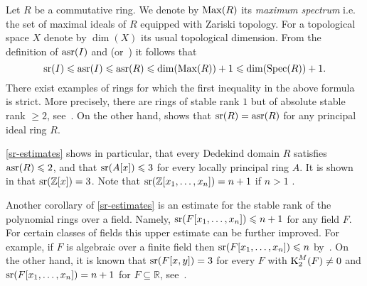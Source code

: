 Let $R$ be a commutative ring. We denote by $\operatorname{Max}(R)$ its \emph{maximum spectrum} i.e. the set of maximal ideals of $R$ equipped with Zariski topology. For a topological space $X$ denote by $\dim(X)$ its usual topological dimension.
From the definition of $\operatorname{asr}(I)$ and \cite[Theorem~2.3]{EO} (or~\cite[Theorem~3.7]{MKV}) it follows that
\begin{equation} \label{sr-estimates} \operatorname{sr}(I)\leqslant\operatorname{asr}(I)\leqslant\operatorname{asr}(R)\leqslant \dim(\operatorname{Max}(R))+1\leqslant\dim(\operatorname{Spec}(R))+1. \end{equation}
There exist examples of rings for which the first inequality in the above formula is strict.
More precisely, there are rings of stable rank $1$ but of absolute stable rank $\geqslant2$, see~\cite{MKV}.
On the other hand, \cite[Theorem~1.3]{MKV} shows that $\operatorname{sr}(R)=\operatorname{asr}(R)$ for any principal ideal ring $R$.
\begin{example}
\eqref{sr-estimates} shows in particular, that every Dedekind domain $R$ satisfies $\operatorname{asr}(R)\leqslant2$, and that $\operatorname{sr}(A[x])\leqslant3$ for every locally principal ring $A$. It is shown in \cite{GruMenVasSL2ZxSL2kxy} that $\operatorname{sr}(\mathbb{Z}[x])=3$. Note that $\operatorname{sr}(\mathbb{Z}[x_1,\ldots,x_n])=n+1$ if $n>1$ \cite[Example after Theorem~18.2]{VasSusSerreProblem}.

Another corollary of \eqref{sr-estimates} is an estimate for the stable rank of the polynomial rings over a field.
Namely, $\operatorname{sr}(F[x_1,\ldots,x_n])\leqslant n+1$ for any field $F$.
For certain classes of fields this upper estimate can be further improved.
For example, if $F$ is algebraic over a finite field then $\operatorname{sr}(F[x_1,\ldots,x_n])\leqslant n$ by~\cite[Corollary~17.4]{VasSusSerreProblem}.
On the other hand, it is known that $\operatorname{sr}(F[x,y])=3$ for every $F$ with $\operatorname{K}_2^M(F)\neq0$ \cite{KrusenmeyerThesis} and $\operatorname{sr}(F[x_1,\ldots,x_n])=n+1$ for $F\subseteq\mathbb{R}$, see~\cite[Theorem~8]{Va71}.
\end{example}

